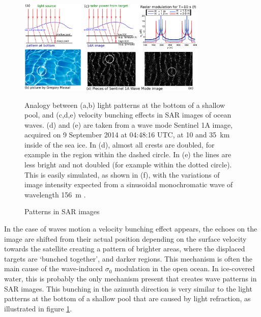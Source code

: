 \begin{figure}[htb]
\centerline{\includegraphics[width=0.8\textwidth]{FIGS_CH_SAT/dessin_fig1_landscape.pdf}}
  \caption{Patterns in SAR images}
    {Analogy between (a,b) light patterns at the bottom of a shallow pool, and (c,d,e) velocity bunching effects
in SAR images of ocean waves. (d) and (e) are taken from a wave mode Sentinel 1A image, acquired on 9 September 2014 at 04:48:16 UTC, 
at 10 and 35~km inside of the sea ice. In (d), almost all crests are doubled, for example in the region within the dashed circle. 
In (e) the lines are less bright and not doubled (for example within the dotted circle). This is easily simulated, as shown in (f), with the variations of image intensity
expected from a sinusoidal monochromatic wave of wavelength 156~m \citep[Adapted from ][]{Ardhuin&al.2017}.} 
\label{fig:SAR_pool}
\end{figure}
In the case of  waves motion a velocity bunching effect appears, the echoes on the image are shifted from their actual
position depending on the surface velocity towards the satellite creating a pattern of brighter areas, where the displaced targets are `bunched 
together', and darker regions. This mechanism is often the main cause of the wave-induced $\sigma_0$ modulation in the open ocean. 
In ice-covered water, this is probably the only mechanism present that creates wave patterns in SAR images. This bunching in the azimuth direction is very 
similar to the light patterns at the bottom of a shallow pool that are caused by light refraction, as illustrated in figure \ref{fig:SAR_pool}. 

